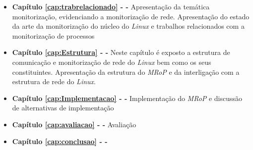 \begin{itemize}
	\item \textbf{Capítulo \ref{cap:trabrelacionado} -  - } Apresentação da temática monitorização, evidenciando a monitorização de rede. Apresentação do estado da arte da monitorização do núcleo do \textit{Linux} e trabalhos relacionados com a monitorização de processos

	\item \textbf{Capítulo \ref{cap:Estrutura} -   - } Neste capítulo é exposto a estrutura de comunicação e monitorização de rede do \textit{Linux} bem como os seus constituintes. Apresentação da estrutura do \textit{MRoP} e da interligação com a estrutura de rede do \textit{Linux}.

	\item \textbf{Capítulo \ref{cap:Implementacao} -  - } Implementação do \textit{MRoP} e discussão de alternativas de implementação

	\item \textbf{Capítulo \ref{cap:avaliacao} -  - } Avaliação 

	\item \textbf{Capítulo \ref{cap:conclusao} -  - } 

\end{itemize}
